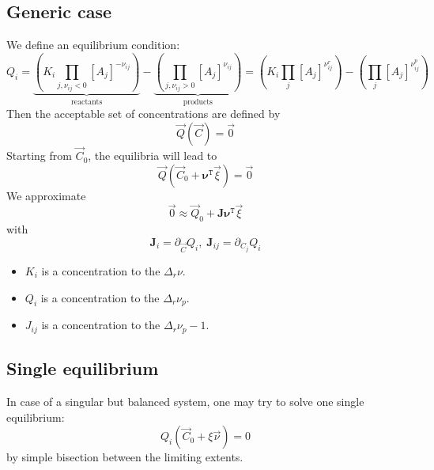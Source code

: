 \documentclass[aps,12pt]{revtex4}
\newcommand{\trn}[1]{{#1}^{\mathtt{T}}}
\newcommand{\conc}[1]{{\left[#1\right]}}
\begin{document}
\subsection{Generic case}
We define an equilibrium condition:
\begin{equation}
	Q_i =  \underbrace{\left(K_i \prod_{j,\nu_{ij}<0} \conc{A_j}^{-\nu_{ij}}\right)}_{\text{reactants}} 
	- \underbrace{\left( \prod_{j,\nu_{ij}>0} \conc{A_j}^{\nu_{ij}}\right)}_{\text{products}}
	= \left(K_i \prod_{j} \conc{A_j}^{\nu^r_{ij}}\right)
	- \left( \prod_{j} \conc{A_j}^{\nu^p_{ij}}\right)  
\end{equation}
Then the acceptable set of concentrations are defined by
\begin{equation}
	\vec{Q}(\vec{C}) = \vec{0}
\end{equation}
Starting from $\vec{C}_0$, the equilibria will lead to
\begin{equation}
	\vec{Q}(\vec{C}_0+\trn{\bm{\nu}} \vec{\xi}) = \vec{0}
\end{equation}
We approximate
\begin{equation}
	\vec{0} \approx \vec{Q}_0 + \bm{J} \trn{\bm{\nu}} \vec{\xi}
\end{equation}
with
\begin{equation}
	\bm{J}_i = \partial_{\vec{C}} Q_i,\; \bm{J}_{ij}= \partial_{C_j} Q_i
\end{equation}

\begin{itemize}
\item $K_i$ is a concentration to the $\Delta_r \nu$.
\item $Q_i$ is a concentration to the $\Delta_r \nu_p$.
\item $J_{ij}$ is a concentration to the $\Delta_r \nu_p-1$.
\end{itemize}

\subsection{Single equilibrium}
In case of a singular but balanced system, one may try to solve one single equilibrium:
\begin{equation}
Q_i\left(\vec{C}_0 + \xi \vec{\nu}\right) = 0
\end{equation}
by simple bisection between the limiting extents.
\end{document}

